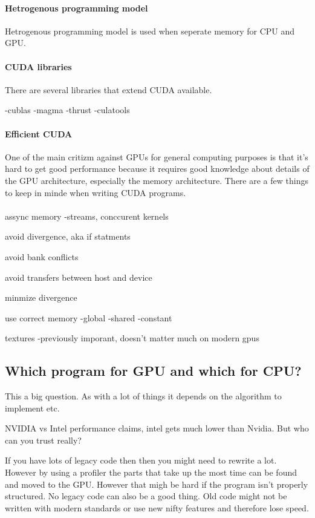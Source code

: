 \documentclass[10pt,a4paper]{article}
\begin{document}
\paragraph{Hetrogenous programming model}
Hetrogenous programming model is used when seperate memory for CPU and GPU.

\paragraph{CUDA libraries}
There are several libraries that extend CUDA available.

-cublas
-magma
-thrust
-culatools


\paragraph{Efficient CUDA}
One of the main critizm against GPUs for general computing purposes is that it's hard to get good performance because it requires good knowledge about details of the GPU architecture, especially the memory architecture. There are a few things to keep in minde when writing CUDA programs.\\
\\
assync memory
-streams, conccurent kernels

avoid divergence, aka if statments

avoid bank conflicts

avoid transfers between host and device

minmize divergence

use correct memory
-global
-shared
-constant

textures
-previously imporant, doesn't matter much on modern gpus

\cite{cuda, cuda_best_practice}

\subsection{Which program for GPU and which for CPU?}
This a big question. As with a lot of things it depends on the algorithm to implement etc.

NVIDIA vs Intel performance claims, intel gets much lower than Nvidia. But who can you trust really?

If you have lots of legacy code then then you might need to rewrite a lot. However by using a profiler the parts that take up the most time can be found and moved to the GPU. However that migh be hard if the program isn't properly structured. No legacy code can also be a good thing. Old code might not be written with modern standards or use new nifty features and therefore lose speed.
\end{document}
